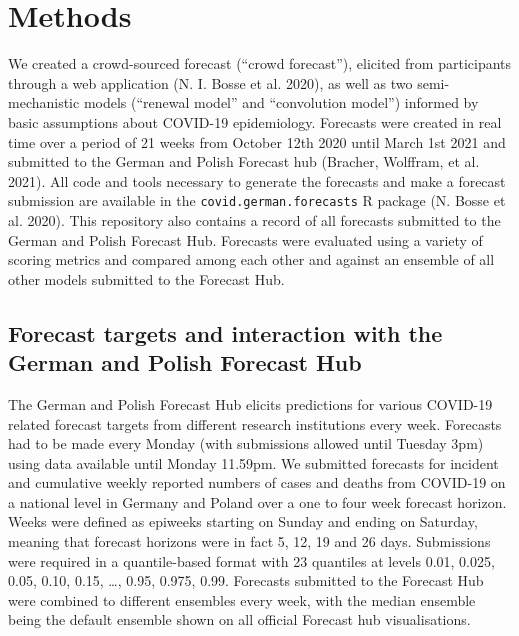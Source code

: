 \documentclass[
]{article}
\begin{document}
\hypertarget{methods}{%
\section{Methods}\label{methods}}

We created a crowd-sourced forecast (``crowd forecast''), elicited from participants through a web application (N. I. Bosse et al. 2020), as well as two semi-mechanistic models (``renewal model'' and ``convolution model'') informed by basic assumptions about COVID-19 epidemiology. Forecasts were created in real time over a period of 21 weeks from October 12th 2020 until March 1st 2021 and submitted to the German and Polish Forecast hub (Bracher, Wolffram, et al. 2021). All code and tools necessary to generate the forecasts and make a forecast submission are available in the \texttt{covid.german.forecasts} R package (N. Bosse et al. 2020). This repository also contains a record of all forecasts submitted to the German and Polish Forecast Hub. Forecasts were evaluated using a variety of scoring metrics and compared among each other and against an ensemble of all other models submitted to the Forecast Hub.

\hypertarget{forecast-targets-and-interaction-with-the-german-and-polish-forecast-hub}{%
\subsection{Forecast targets and interaction with the German and Polish Forecast Hub}\label{forecast-targets-and-interaction-with-the-german-and-polish-forecast-hub}}

The German and Polish Forecast Hub elicits predictions for various COVID-19 related forecast targets from different research institutions every week. Forecasts had to be made every Monday (with submissions allowed until Tuesday 3pm) using data available until Monday 11.59pm. We submitted forecasts for incident and cumulative weekly reported numbers of cases and deaths from COVID-19 on a national level in Germany and Poland over a one to four week forecast horizon. Weeks were defined as epiweeks starting on Sunday and ending on Saturday, meaning that forecast horizons were in fact 5, 12, 19 and 26 days. Submissions were required in a quantile-based format with 23 quantiles at levels 0.01, 0.025, 0.05, 0.10, 0.15, \ldots, 0.95, 0.975, 0.99. Forecasts submitted to the Forecast Hub were combined to different ensembles every week, with the median ensemble being the default ensemble shown on all official Forecast hub visualisations.
\end{document}
